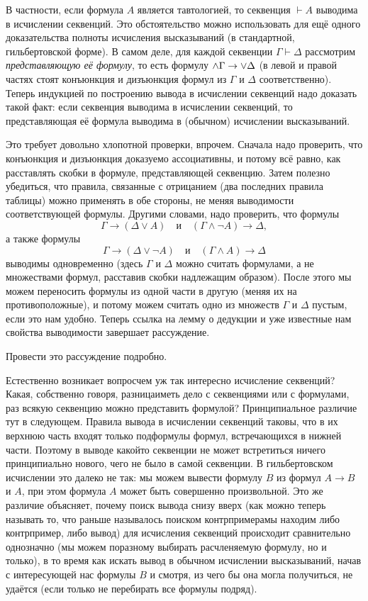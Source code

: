В частности, если формула $A$ является тавтологией, то секвенция
${\vdash A}$ выводима в исчислении секвенций. Это обстоятельство
можно использовать для ещё одного доказательства полноты
исчисления высказываний (в стандартной, гильбертовской форме). В
самом деле, для каждой секвенции $\Gamma\vdash\Delta$ рассмотрим
\emph{представляющую её формулу},%
%
то есть формулу ${\land
\Gamma} \hm\to {\lor\Delta}$ (в левой и правой частях стоят
конъюнкция и дизъюнкция формул из $\Gamma$ и $\Delta$
соответственно). Теперь индукцией по построению вывода в
исчислении секвенций надо доказать такой факт: если секвенция
выводима в исчислении секвенций, то представляющая её формула
выводима в (обычном) исчислении высказываний.

Это требует довольно хлопотной проверки, впрочем. Сначала надо
проверить, что конъюнкция и дизъюнкция доказуемо ассоциативны, и
потому всё равно, как расставлять скобки в формуле,
представляющей секвенцию. Затем полезно убедиться, что правила,
связанные с отрицанием (два последних правила таблицы) можно
применять в обе стороны, не меняя выводимости соответствующей
формулы. Другими словами, надо проверить, что формулы
        $$
 \Gamma\to(\Delta\lor A) \quad \text{и} \quad
 (\Gamma\land\lnot A)\to\Delta,
        $$
а также формулы
        $$
 \Gamma\to(\Delta\lor \lnot A) \quad \text{и} \quad
 (\Gamma\land A)\to\Delta
        $$
выводимы одновременно (здесь $\Gamma$ и $\Delta$ можно считать
формулами, а не множествами формул, расставив скобки надлежащим
образом). После этого мы можем переносить формулы из одной части
в другую (меняя их на противоположные), и потому можем считать
одно из множеств $\Gamma$ и $\Delta$ пустым, если это нам
удобно. Теперь ссылка на лемму о дедукции и уже известные нам
свойства выводимости завершает рассуждение.

\begin{problem}
Провести это рассуждение подробно.
\end{problem}

Естественно возникает вопрос\т чем уж так интересно исчисление
секвенций? Какая, собственно говоря, разница\т иметь дело с
секвенциями или с формулами, раз всякую секвенцию можно
представить формулой? Принципиальное различие тут в следующем.
Правила вывода в исчислении секвенций таковы, что в их верхнюю
часть входят только подформулы формул, встречающихся в нижней
части. Поэтому в выводе какой\д то секвенции не может встретиться
ничего принципиально нового, чего не было в самой секвенции. В
гильбертовском исчислении это далеко не так: мы можем вывести
формулу $B$ из формул $A\to B$ и $A$, при этом формула $A$ может
быть совершенно произвольной. Это же различие объясняет, почему
поиск вывода снизу вверх (как можно теперь называть то, что
раньше называлось поиском контрпримера\т мы находим либо
контрпример, либо вывод) для исчисления секвенций происходит
сравнительно однозначно (мы можем по\д разному выбирать
расчленяемую формулу, но и только), в то время как искать вывод
в обычном исчислении высказываний, начав с интересующей нас
формулы $B$ и смотря, из чего бы она могла получиться, не
удаётся (если только не перебирать все формулы подряд).

